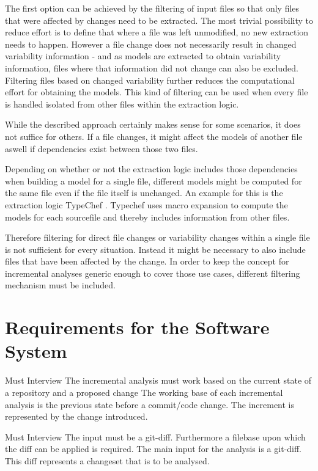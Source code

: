 \documentclass[a4paper]{article}
\begin{document}
The first option can be achieved by the filtering of input files so that only files that were affected by changes need to be extracted. The most trivial possibility to reduce effort is to define that where a file was left unmodified, no new extraction needs to happen. 
However a file change does not necessarily result in changed variability information - and as models are extracted to obtain variability information, files where that information did not change can also be excluded. Filtering files based on changed variability further reduces the computational effort for obtaining the models. This kind of filtering can be used when every file is handled isolated from other files within the extraction logic.

While the described approach certainly makes sense for some scenarios, it does not suffice for others. If a file changes, it might affect the models of another file aswell if dependencies exist between those two files.

Depending on whether or not the extraction logic includes those dependencies when building a model for a single file, different models might be computed for the same file even if the file itself is unchanged. An example for this is the extraction logic TypeChef \cite{Kenner:2010:TTT:1868688.1868693}. Typechef uses macro expansion to compute the models for each sourcefile and thereby includes information from other files. 

Therefore filtering for direct file changes or variability changes within a single file is not sufficient for every situation. Instead it might be necessary to also include files that have been affected by the change. In order to keep the concept for incremental analyses generic enough to cover those use cases, different filtering mechanism must be included. 



\clearpage
\section{Requirements for the Software System}

\begin{req}
	\reqtable
	{Must}  {Interview}
	{The incremental analysis must work based on the current state of a repository and a proposed change}
	{The working base of each incremental analysis is the previous state before a commit/code change. The increment is represented by the change introduced.}
	
	\begin{subreq} \label{req:git-diff}
		\reqtable
		{Must}  {Interview}
		{The input must be a git-diff. Furthermore a filebase upon which the diff can be applied is required.}
		{The main input for the analysis is a git-diff. This diff represents a changeset that is to be analysed.}
	\end{subreq}
\end{req}
\end{document}
